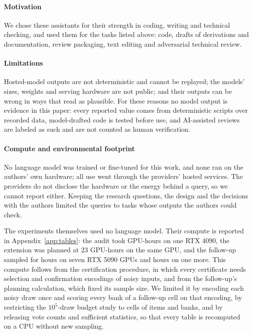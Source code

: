 \paragraph{Motivation}
We chose these assistants for their strength in coding, writing and technical checking, and used them for the tasks listed above: code, drafts of derivations and documentation, review packaging, text editing and adversarial technical review.

\paragraph{Limitations}
Hosted-model outputs are not deterministic and cannot be replayed; the models' sizes, weights and serving hardware are not public; and their outputs can be wrong in ways that read as plausible. For these reasons no model output is evidence in this paper: every reported value comes from deterministic scripts over recorded data, model-drafted code is tested before use, and AI-assisted reviews are labeled as such and are not counted as human verification.

\paragraph{Compute and environmental footprint}
No language model was trained or fine-tuned for this work, and none ran on the authors' own hardware; all use went through the providers' hosted services. The providers do not disclose the hardware or the energy behind a query, so we cannot report either. Keeping the research questions, the design and the decisions with the authors limited the queries to tasks whose outputs the authors could check.

The experiments themselves used no language model. Their compute is reported in Appendix~\ref{app:tables}: the audit took \ExpElapsedHours{} GPU-hours on one RTX 4090, the extension was planned at 23 GPU-hours on the same GPU, and the follow-up sampled for \FUMainHours{} hours on seven RTX 5090 GPUs and \FUExtraHours{} hours on one more. This compute follows from the certification procedure, in which every certificate needs \ExpSelDraws{} selection and \ExpConfDraws{} confirmation encodings of noisy inputs, and from the follow-up's planning calculation, which fixed its sample size. We limited it by encoding each noisy draw once and scoring every bank of a follow-up cell on that encoding, by restricting the $10^5$-draw budget study to \FUCellsC{} cells of \FUItemsC{} items and \FUBanksC{} banks, and by releasing vote counts and sufficient statistics, so that every table is recomputed on a CPU without new sampling.
\let\theHparagraph\satmlSavedTheHparagraph %
